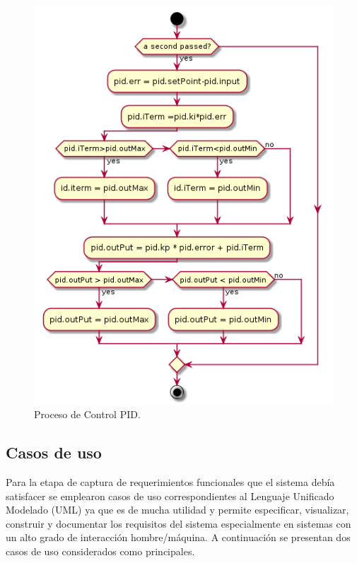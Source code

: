 	
\begin{figure}
	\centering
	\includegraphics[scale=.65]{./Figures/procesocontrolPID.png}
	\caption{Proceso de Control PID.}
	\label{fig:Proceso de Control PID}
	\end{figure}
\subsection{Casos de uso}
\label{subsec:Casos de uso}
Para la etapa de captura de requerimientos funcionales que el sistema debía satisfacer se emplearon casos de uso correspondientes al Lenguaje Unificado Modelado (UML) ya que es de mucha utilidad y permite especificar, visualizar, construir y documentar los requisitos del sistema especialmente en sistemas con un alto grado de interacción hombre/máquina. A continuación se presentan dos casos de uso considerados como principales.

